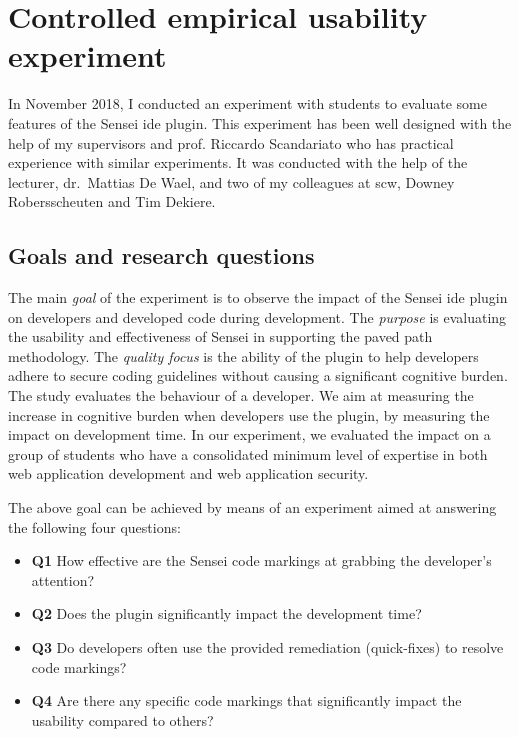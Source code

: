 \section{Controlled empirical usability experiment}
\label{sec:experiment}

In November 2018, I conducted an experiment with students to evaluate some features of the Sensei \gls{ide} plugin.
This experiment has been well designed with the help of my supervisors and prof. Riccardo Scandariato who has practical experience with similar experiments.
It was conducted with the help of the lecturer, dr.\ Mattias De Wael, and two of my colleagues at \gls{scw}, Downey Robersscheuten and Tim Dekiere.

\subsection{Goals and research questions}
The main \textit{goal} of the experiment is to observe the impact of the Sensei \gls{ide} plugin on developers and developed code during development.
The \textit{purpose} is evaluating the usability and effectiveness of Sensei in supporting the paved path methodology.
The \textit{quality focus} is the ability of the plugin to help developers adhere to secure coding guidelines without causing a significant cognitive burden.
The study evaluates the behaviour of a developer.
We aim at measuring the increase in cognitive burden when developers use the plugin, by measuring the impact on development time.
In our experiment, we evaluated the impact on a group of students who have a consolidated minimum level of expertise in both web application development and web application security.

The above goal can be achieved by means of an experiment aimed at answering the following four questions:
\begin{itemize}
    \item \textbf{Q1} How effective are the Sensei code markings at grabbing the developer's attention?
    \item \textbf{Q2} Does the plugin significantly impact the development time?
    \item \textbf{Q3} Do developers often use the provided remediation (quick-fixes) to resolve code markings?
    \item \textbf{Q4} Are there any specific code markings that significantly impact the usability compared to others?
\end{itemize}

